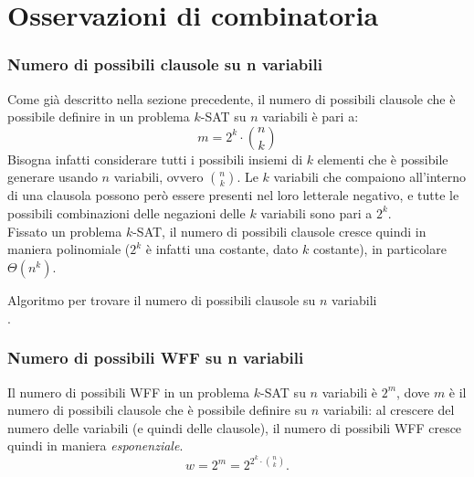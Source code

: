 \clearpage

\section{Osservazioni di combinatoria}
\subsubsection{Numero di possibili clausole su n variabili}
Come già descritto nella sezione precedente, il numero di possibili clausole che è possibile definire in un problema $k$-SAT su $n$ variabili è pari a:
\begin{equation*}
    m = 2^k \cdot \binom{n}{k}
\end{equation*}
Bisogna infatti considerare tutti i possibili insiemi di $k$ elementi
che è possibile generare usando $n$ variabili, ovvero $\binom{n}{k}$.
Le $k$ variabili che compaiono all'interno di una clausola possono però
essere presenti nel loro letterale negativo, e tutte le possibili combinazioni
delle negazioni delle $k$ variabili sono pari a $2^k$.\\
Fissato un problema $k$-SAT, il numero di possibili clausole cresce
quindi in maniera polinomiale ($2^k$ è infatti una costante, dato $k$ costante), in particolare
$\Theta(n^k)$.

\begin{algorithm}
    \caption{Algoritmo per trovare il numero di possibili clausole su $n$ variabili}
    \label{alg:calc_clauses_num}
    \begin{algorithmic}
            \State \Return {} $\cdot$  
        \EndProcedure
    \end{algorithmic}
\end{algorithm}


\subsubsection{Numero di possibili WFF su n variabili}
Il numero di possibili WFF in un problema $k$-SAT su $n$ variabili è $2^m$,
dove $m$ è il numero di possibili clausole che è possibile definire su $n$ variabili:
al crescere del numero delle variabili (e quindi delle clausole), il numero 
di possibili WFF cresce quindi in maniera \textit{esponenziale}.
\begin{equation*}
    w = 2^m = 2^{2^k \cdot \binom{n}{k}}.
\end{equation*}

